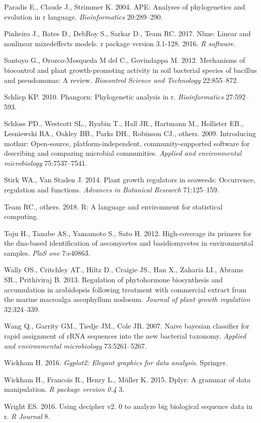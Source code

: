 \documentclass[11pt,]{article}
\begin{document}
\hypertarget{ref-paradis2004ape}{}
Paradis E., Claude J., Strimmer K. 2004. APE: Analyses of phylogenetics
and evolution in r language. \emph{Bioinformatics} 20:289--290.

\hypertarget{ref-pinheiro2017nlme}{}
Pinheiro J., Bates D., DebRoy S., Sarkar D., Team RC. 2017. Nlme: Linear
and nonlinear mixedeffects models. r package version 3.1-128. 2016.
\emph{R software}.

\hypertarget{ref-santoyo2012mechanisms}{}
Santoyo G., Orozco-Mosqueda M del C., Govindappa M. 2012. Mechanisms of
biocontrol and plant growth-promoting activity in soil bacterial species
of bacillus and pseudomonas: A review. \emph{Biocontrol Science and
Technology} 22:855--872.

\hypertarget{ref-schliep2010phangorn}{}
Schliep KP. 2010. Phangorn: Phylogenetic analysis in r.
\emph{Bioinformatics} 27:592--593.

\hypertarget{ref-schloss2009introducing}{}
Schloss PD., Westcott SL., Ryabin T., Hall JR., Hartmann M., Hollister
EB., Lesniewski RA., Oakley BB., Parks DH., Robinson CJ., others. 2009.
Introducing mothur: Open-source, platform-independent,
community-supported software for describing and comparing microbial
communities. \emph{Applied and environmental microbiology}
75:7537--7541.

\hypertarget{ref-stirk2014plant}{}
Stirk WA., Van Staden J. 2014. Plant growth regulators in seaweeds:
Occurrence, regulation and functions. \emph{Advances in Botanical
Research} 71:125--159.

\hypertarget{ref-team2018r}{}
Team RC., others. 2018. R: A language and environment for statistical
computing.

\hypertarget{ref-toju2012high}{}
Toju H., Tanabe AS., Yamamoto S., Sato H. 2012. High-coverage its
primers for the dna-based identification of ascomycetes and
basidiomycetes in environmental samples. \emph{PloS one} 7:e40863.

\hypertarget{ref-wally2013regulation}{}
Wally OS., Critchley AT., Hiltz D., Craigie JS., Han X., Zaharia LI.,
Abrams SR., Prithiviraj B. 2013. Regulation of phytohormone biosynthesis
and accumulation in arabidopsis following treatment with commercial
extract from the marine macroalga ascophyllum nodosum. \emph{Journal of
plant growth regulation} 32:324--339.

\hypertarget{ref-wang2007naive}{}
Wang Q., Garrity GM., Tiedje JM., Cole JR. 2007. Naive bayesian
classifier for rapid assignment of rRNA sequences into the new bacterial
taxonomy. \emph{Applied and environmental microbiology} 73:5261--5267.

\hypertarget{ref-wickham2016ggplot2}{}
Wickham H. 2016. \emph{Ggplot2: Elegant graphics for data analysis}.
Springer.

\hypertarget{ref-wickham2015dplyr}{}
Wickham H., Francois R., Henry L., Müller K. 2015. Dplyr: A grammar of
data manipulation. \emph{R package version 0.4} 3.

\hypertarget{ref-wright2016using}{}
Wright ES. 2016. Using decipher v2. 0 to analyze big biological sequence
data in r. \emph{R Journal} 8.




\newpage
\singlespacing 
\end{document}
